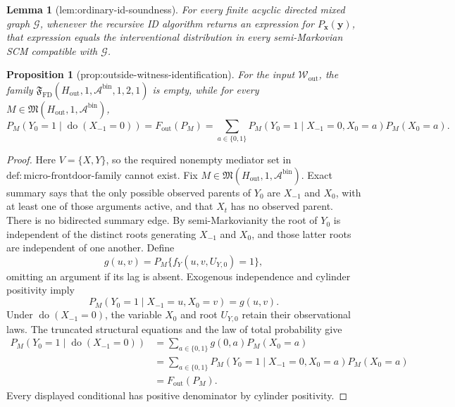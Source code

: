 \documentclass{article}
\newtheorem{lemma}{Lemma}
\newtheorem{proposition}{Proposition}
\begin{document}
\begin{lemma}[lem:ordinary-id-soundness]\label{lem:ordinary-id-soundness}
For every finite acyclic directed mixed graph \(\mathcal G\), whenever the recursive ID algorithm returns an expression for \(P_{\mathbf x}(\mathbf y)\), that expression equals the interventional distribution in every semi-Markovian SCM compatible with \(\mathcal G\).
\end{lemma}

\begin{proposition}[prop:outside-witness-identification]\label{prop:outside-witness-identification}
For the input \(\mathcal W_{\mathrm{out}}\), the family \(\mathfrak F_{\mathrm{FD}}(H_{\mathrm{out}},1,\mathcal A^{\mathrm{bin}},1,2,1)\) is empty, while for every \(M\in\mathfrak M(H_{\mathrm{out}},1,\mathcal A^{\mathrm{bin}})\),
\[
 P_M(Y_0=1\mid\operatorname{do}(X_{-1}=0))
 =F_{\mathrm{out}}(P_M)
 =\sum_{a\in\{0,1\}}P_M(Y_0=1\mid X_{-1}=0,X_0=a)P_M(X_0=a).
\]
\end{proposition}
\begin{proof}
Here \(V=\{X,Y\}\), so the required nonempty mediator set in \(\mathrm{def:micro\text{-}frontdoor\text{-}family}\) cannot exist.  Fix \(M\in\mathfrak M(H_{\mathrm{out}},1,\mathcal A^{\mathrm{bin}})\).  Exact summary says that the only possible observed parents of \(Y_0\) are \(X_{-1}\) and \(X_0\), with at least one of those arguments active, and that \(X_t\) has no observed parent.  There is no bidirected summary edge.  By semi-Markovianity the root of \(Y_0\) is independent of the distinct roots generating \(X_{-1}\) and \(X_0\), and those latter roots are independent of one another.  Define
\[
 g(u,v)=P_M\{f_Y(u,v,U_{Y,0})=1\},
\]
omitting an argument if its lag is absent.  Exogenous independence and cylinder positivity imply
\[
 P_M(Y_0=1\mid X_{-1}=u,X_0=v)=g(u,v).
\]
Under \(\operatorname{do}(X_{-1}=0)\), the variable \(X_0\) and root \(U_{Y,0}\) retain their observational laws.  The truncated structural equations and the law of total probability give
\[
 \begin{aligned}
 P_M(Y_0=1\mid\operatorname{do}(X_{-1}=0))
 &=\sum_{a\in\{0,1\}}g(0,a)P_M(X_0=a)\\
 &=\sum_{a\in\{0,1\}}P_M(Y_0=1\mid X_{-1}=0,X_0=a)P_M(X_0=a)\\
 &=F_{\mathrm{out}}(P_M).
 \end{aligned}
\]
Every displayed conditional has positive denominator by cylinder positivity.
\end{proof}
\end{document}
